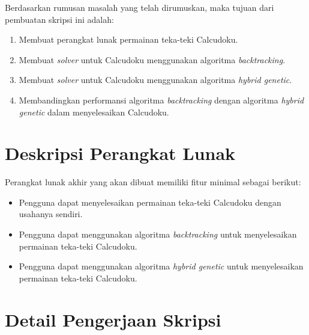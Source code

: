 \documentclass[a4paper,twoside]{article}
\begin{document}
Berdasarkan rumusan masalah yang telah dirumuskan, maka tujuan dari pembuatan skripsi ini adalah:
\begin{enumerate}
\item Membuat perangkat lunak permainan teka-teki Calcudoku.
\item Membuat \textit{solver} untuk Calcudoku menggunakan algoritma \textit{backtracking}.
\item Membuat \textit{solver} untuk Calcudoku menggunakan algoritma \textit{hybrid genetic}.
\item Membandingkan performansi algoritma \textit{backtracking} dengan algoritma \textit{hybrid genetic} dalam menyelesaikan Calcudoku.
\end{enumerate}

\section{Deskripsi Perangkat Lunak}

Perangkat lunak akhir yang akan dibuat memiliki fitur minimal sebagai berikut:
\begin{itemize}
	\item Pengguna dapat menyelesaikan permainan teka-teki Calcudoku dengan usahanya sendiri.
	\item Pengguna dapat menggunakan algoritma \textit{backtracking} untuk menyelesaikan permainan teka-teki Calcudoku.
	\item Pengguna dapat menggunakan algoritma \textit{hybrid genetic} untuk menyelesaikan permainan teka-teki Calcudoku.
\end{itemize}

\section{Detail Pengerjaan Skripsi}
\end{document}
